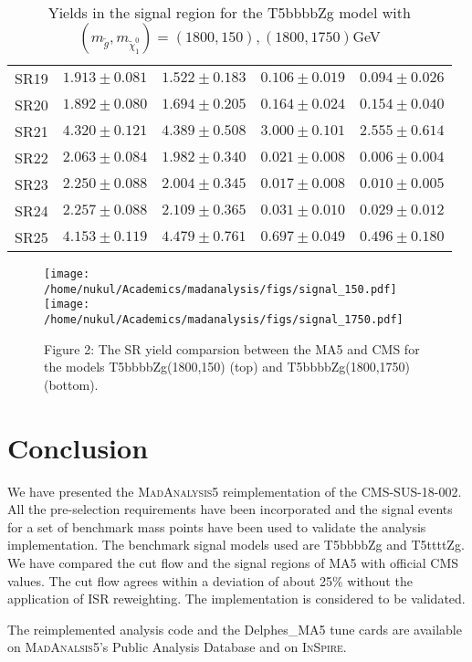 \documentclass[a4paper, 10pt]{article}
\begin{document}
\begin{table}
\begin{center}
\begin{tabular}{c || c | c || c | c }
 SR19 & $1.913 \pm 0.081$ & $1.522 \pm 0.183$ & $0.106 \pm 0.019$ & $0.094 \pm 0.026$ \\
 SR20 & $1.892 \pm 0.080$ & $1.694 \pm 0.205$ & $0.164 \pm 0.024$ & $0.154 \pm 0.040$ \\
 SR21 & $4.320 \pm 0.121$ & $4.389 \pm 0.508$ & $3.000 \pm 0.101$ & $2.555 \pm 0.614$ \\
 SR22 & $2.063 \pm 0.084$ & $1.982 \pm 0.340$ & $0.021 \pm 0.008$ & $0.006 \pm 0.004$ \\
 SR23 & $2.250 \pm 0.088$ & $2.004 \pm 0.345$ & $0.017 \pm 0.008$ & $0.010 \pm 0.005$ \\
 SR24 & $2.257 \pm 0.088$ & $2.109 \pm 0.365$ & $0.031 \pm 0.010$ & $0.029 \pm 0.012$ \\
 SR25 & $4.153 \pm 0.119$ & $4.479 \pm 0.761$ & $0.697 \pm 0.049$ & $0.496 \pm 0.180$ \\
\hline \hline	

\end{tabular}  
\caption{Yields in the signal region for the T5bbbbZg model with $(m_{\tilde{g}},m_{\tilde{\chi}_{1}^{0}}) = (1800,150) , (1800,1750)$GeV}
\label{table:3}  
\end{center}
\end{table}

\begin{figure}[h] 

\centering 
\texttt{[image: /home/nukul/Academics/madanalysis/figs/signal\_150.pdf]}
\texttt{[image: /home/nukul/Academics/madanalysis/figs/signal\_1750.pdf]}
\caption{Figure 2: The SR yield comparsion between the MA5 and CMS for the models T5bbbbZg(1800,150) (top) and T5bbbbZg(1800,1750) (bottom).   }
\end{figure}

\section{Conclusion}
We have presented the \textsc{MadAnalysis5} reimplementation of the CMS-SUS-18-002. All the pre-selection requirements have been incorporated and the signal events for a set of benchmark mass points have been used to validate the analysis implementation. The benchmark signal models used are T5bbbbZg and T5ttttZg. We have compared the cut flow and the signal regions of MA5 with official CMS values. The cut flow agrees within a deviation of about 25\% without the application of ISR reweighting. The implementation is considered to be validated.   

The reimplemented analysis code and the Delphes\_MA5 tune cards are available on \textsc{MadAnalsis5}'s Public Analysis Database and on \textsc{InSpire}.    



\newpage





 
\end{document}
